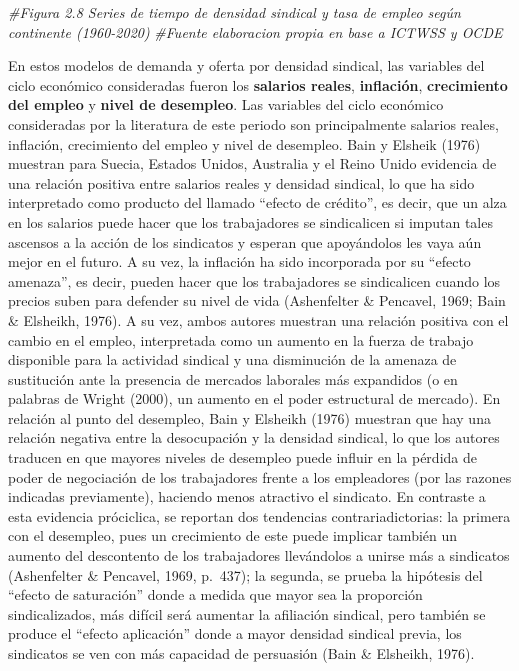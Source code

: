 \documentclass[
]{book}
\newenvironment{Shaded}{\begin{snugshade}}{\end{snugshade}}
\newcommand{\CommentTok}[1]{\textcolor[rgb]{0.56,0.35,0.01}{\textit{#1}}}
\begin{document}
\begin{Shaded}
\begin{Highlighting}[]
\CommentTok{#Figura 2.8 Series de tiempo de densidad sindical y tasa de empleo según continente (1960-2020)}
\CommentTok{#Fuente elaboracion propia en base a ICTWSS y OCDE}
\end{Highlighting}
\end{Shaded}

En estos modelos de demanda y oferta por densidad sindical, las variables del ciclo económico consideradas fueron los \textbf{salarios reales}, \textbf{inflación}, \textbf{crecimiento del empleo} y \textbf{nivel de desempleo}. Las variables del ciclo económico consideradas por la literatura de este periodo son principalmente salarios reales, inflación, crecimiento del empleo y nivel de desempleo. Bain y Elsheik (1976) muestran para Suecia, Estados Unidos, Australia y el Reino Unido evidencia de una relación positiva entre salarios reales y densidad sindical, lo que ha sido interpretado como producto del llamado ``efecto de crédito'', es decir, que un alza en los salarios puede hacer que los trabajadores se sindicalicen si imputan tales ascensos a la acción de los sindicatos y esperan que apoyándolos les vaya aún mejor en el futuro. A su vez, la inflación ha sido incorporada por su ``efecto amenaza'', es decir, pueden hacer que los trabajadores se sindicalicen cuando los precios suben para defender su nivel de vida (Ashenfelter \& Pencavel, 1969; Bain \& Elsheikh, 1976). A su vez, ambos autores muestran una relación positiva con el cambio en el empleo, interpretada como un aumento en la fuerza de trabajo disponible para la actividad sindical y una disminución de la amenaza de sustitución ante la presencia de mercados laborales más expandidos (o en palabras de Wright (2000), un aumento en el poder estructural de mercado). En relación al punto del desempleo, Bain y Elsheikh (1976) muestran que hay una relación negativa entre la desocupación y la densidad sindical, lo que los autores traducen en que mayores niveles de desempleo puede influir en la pérdida de poder de negociación de los trabajadores frente a los empleadores (por las razones indicadas previamente), haciendo menos atractivo el sindicato. En contraste a esta evidencia próciclica, se reportan dos tendencias contrariadictorias: la primera con el desempleo, pues un crecimiento de este puede implicar también un aumento del descontento de los trabajadores llevándolos a unirse más a sindicatos (Ashenfelter \& Pencavel, 1969, p.~437); la segunda, se prueba la hipótesis del ``efecto de saturación'' donde a medida que mayor sea la proporción sindicalizados, más difícil será aumentar la afiliación sindical, pero también se produce el ``efecto aplicación'' donde a mayor densidad sindical previa, los sindicatos se ven con más capacidad de persuasión (Bain \& Elsheikh, 1976).
\end{document}
